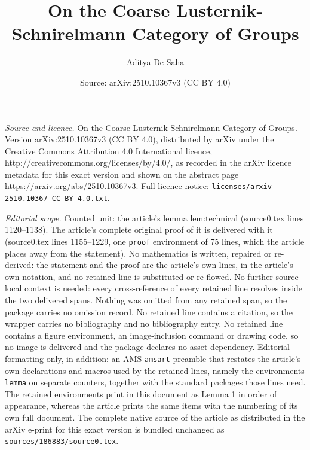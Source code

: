 \documentclass[10pt,a4paper]{amsart}
\title{On the Coarse Lusternik-Schnirelmann Category of Groups}
\author{Aditya De Saha}
\date{Source: arXiv:2510.10367v3 (CC BY 4.0)}
\begin{document}
\maketitle

\noindent\emph{Source and licence.} On the Coarse Lusternik-Schnirelmann Category of Groups. Version arXiv:2510.10367v3 (CC BY 4.0), distributed by arXiv under the Creative Commons Attribution 4.0 International licence, http://creativecommons.org/licenses/by/4.0/, as recorded in the arXiv licence metadata for this exact version and shown on the abstract page https://arxiv.org/abs/2510.10367v3. Full licence notice: \texttt{licenses/arxiv-2510.10367-CC-BY-4.0.txt}.\par\smallskip

\noindent\textit{Editorial scope.} Counted unit: the article's lemma lem:technical (source0.tex lines 1120--1138). The article's complete original proof of it is delivered with it (source0.tex lines 1155--1229, one \texttt{proof} environment of 75 lines, which the article places away from the statement). No mathematics is written, repaired or re-derived: the statement and the proof are the article's own lines, in the article's own notation, and no retained line is substituted or re-flowed.  No further source-local context is needed: every cross-reference of every retained line resolves inside the two delivered spans.  Nothing was omitted from any retained span, so the package carries no omission record.  No retained line contains a citation, so the wrapper carries no bibliography and no bibliography entry.  No retained line contains a figure environment, an image-inclusion command or drawing code, so no image is delivered and the package declares no asset dependency.  Editorial formatting only, in addition: an AMS \texttt{amsart} preamble that restates the article's own declarations and macros used by the retained lines, namely the environments \texttt{lemma} on separate counters, together with the standard packages those lines need.  The retained environments print in this document as Lemma 1 in order of appearance, whereas the article prints the same items with the numbering of its own full document.  The complete native source of the article as distributed in the arXiv e-print for this exact version is bundled unchanged as \texttt{sources/186883/source0.tex}.
\end{document}
